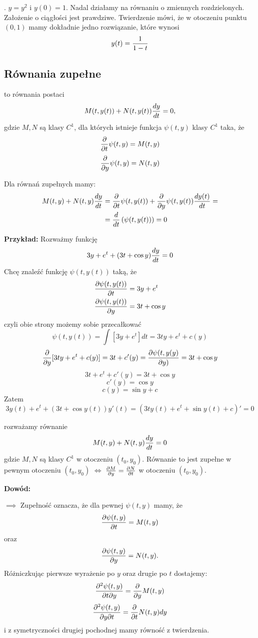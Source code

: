 . $y=y^2$ i $y(0)=1$. Nadal działamy na równaniu o zmiennych rozdzielonych. Założenie o ciągłości jest prawdziwe. Twierdzenie mówi, że w otoczeniu punktu $(0, 1)$ mamy dokładnie jedno rozwiązanie, które wynosi 
$$y(t)={1\over 1-t}$$


\subsection{Równania zupełne}

 to równania postaci
$$M(t, y(t))+N(t, y(t)){dy\over dt}=0,$$
gdzie $M, N$ są klasy $C^1$, dla których istnieje funkcja $\psi(t, y)$ klasy $C^1$ taka, że 
$${\partial\over \partial t}\psi(t, y)=M(t, y)$$
$${\partial\over\partial y}\psi(t, y)=N(t, y)$$

Dla równań zupełnych mamy:
\begin{align*}
    M(t, y)+N(t, y){dy\over dt}&={\partial\over \partial t}\psi(t, y(t))+{\partial\over\partial y}\psi(t, y(t)){dy(t)\over dt}=\\
    &={d\over dt}\left(\psi(t, y(t))\right)=0
\end{align*}

\textbf{Przykład:} Rozważmy funkcję
$$3y+e^t+(3t+\cos y){dy\over dt}=0$$
Chcę znaleźć funkcję $\psi(t, y(t))$ taką, że
\begin{align*}
    {\partial\psi(t, y(t))\over\partial t}&=3y+e^t\\
    {\partial\psi(t, y(t))\over\partial y}&=3t+\cos y
\end{align*}
czyli obie strony możemy sobie przecałkować
$$\psi(t, y(t))=\int [3y+e^t]dt=3ty+e^t+c(y)$$
$${\partial\over\partial y}[3ty+e^t+c(y)]=3t+c'(y)={\partial\psi(t,y(y)\over\partial y)}=3t+\cos y$$
$$3t+e^t+c'(y)=3t+\cos y$$
$$c'(y)=\cos y$$
$$c(y)=\sin y+c$$
Zatem
$$3y(t)+e^t+(3t+\cos y(t))y'(t)=(3ty(t)+e^t+\sin y(t)+c)'=0$$

 rozważamy równanie
$$M(t, y)+N(t, y){dy\over dt}=0$$
gdzie $M, N$ są klasy $C^1$ w otoczeniu $(t_0, y_0)$. Równanie to jest zupełne w pewnym otoczeniu $(t_0, y_0)$ $\iff$ ${\partial M\over\partial y}={\partial N\over\partial t}$ w otoczeniu $(t_0, y_0)$.

\textbf{Dowód:}

$\implies$ Zupełność oznacza, że dla pewnej $\psi(t, y)$ mamy, że 
$${\partial\psi(t, y)\over \partial t}=M(t, y)$$ 
oraz 
$${\partial\psi(t, y)\over\partial y}=N(t, y).$$
Różniczkując pierwsze wyrażenie po $y$ oraz drugie po $t$ dostajemy:
$${\partial^2\psi(t, y)\over\partial t\partial y}={\partial\over\partial y} M(t, y)$$
$${\partial^2\psi(t, y)\over\partial y\partial t}={\partial\over\partial t} N(t, y)dy$$
i z symetryczności drugiej pochodnej mamy równość z twierdzenia.


